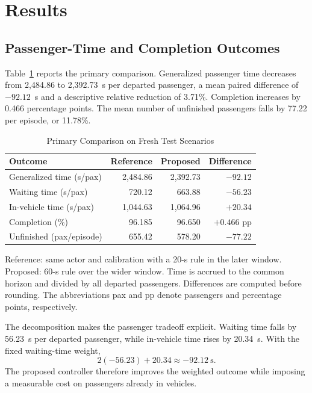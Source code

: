 \documentclass[letterpaper,journal]{IEEEtran}
\begin{document}
\section{Results}
\label{sec:results}
\subsection{Passenger-Time and Completion Outcomes}
Table~\ref{tab:primary} reports the primary comparison. Generalized passenger time decreases from 2,484.86 to 2,392.73~s per departed passenger, a mean paired difference of \(-92.12\)~s and a descriptive relative reduction of 3.71\%. Completion increases by 0.466 percentage points. The mean number of unfinished passengers falls by 77.22 per episode, or 11.78\%.

\begin{table}[!t]
\caption{Primary Comparison on Fresh Test Scenarios}
\label{tab:primary}
\centering
\footnotesize
\setlength{\tabcolsep}{3pt}
\begin{tabular}{@{}lrrr@{}}
\toprule
Outcome & Reference & Proposed & Difference\\
\midrule
Generalized time (s/pax) & 2,484.86 & 2,392.73 & \(-92.12\)\\
Waiting time (s/pax) & 720.12 & 663.88 & \(-56.23\)\\
In-vehicle time (s/pax) & 1,044.63 & 1,064.96 & \(+20.34\)\\
Completion (\%) & 96.185 & 96.650 & \(+0.466\) pp\\
Unfinished (pax/episode) & 655.42 & 578.20 & \(-77.22\)\\
\bottomrule
\end{tabular}
\par\smallskip
\begin{minipage}{\columnwidth}
\footnotesize
Reference: same actor and calibration with a 20-s rule in the later window. Proposed: 60-s rule over the wider window. Time is accrued to the common horizon and divided by all departed passengers. Differences are computed before rounding. The abbreviations pax and pp denote passengers and percentage points, respectively.
\end{minipage}
\end{table}

The decomposition makes the passenger tradeoff explicit. Waiting time falls by 56.23~s per departed passenger, while in-vehicle time rises by 20.34~s. With the fixed waiting-time weight,
\[
 2(-56.23)+20.34\approx-92.12~\mathrm{s}.
\]
The proposed controller therefore improves the weighted outcome while imposing a measurable cost on passengers already in vehicles.
\end{document}

